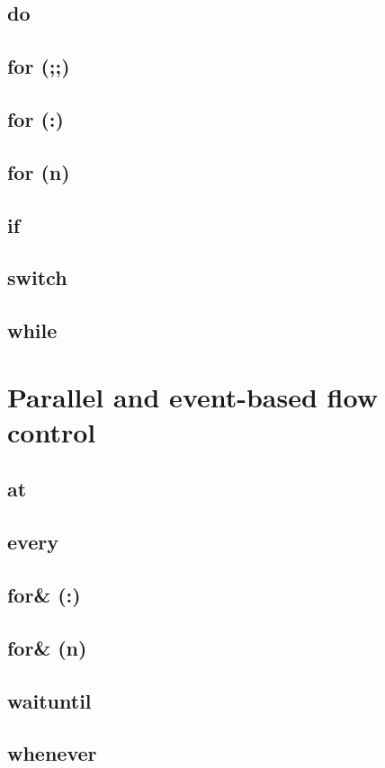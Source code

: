 \documentclass[openright,twoside,12pt]{report}
\begin{document}
\subsection{do}
\subsection{for (;;)}
\subsection{for (:)}
\subsection{for (n)}
\subsection{if}
\subsection{switch}
\subsection{while}

\FloatBarrier
\section{Parallel and event-based flow control}

\subsection{at}
\subsection{every}
\subsection{for\& (:)}
\subsection{for\& (n)}
\subsection{waituntil}
\subsection{whenever}
\end{document}
